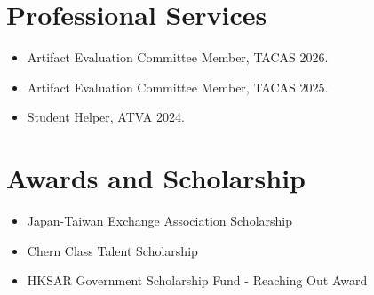 \documentclass[10pt,a4paper,roman]{moderncv}        %
\makeatletter
\newcommand*{\customcventry}[5][.25em]{
  \begin{tabular}{@{}l} 
    {\bfseries #2}
  \end{tabular}
  \hfill%
  \begin{tabular}{l@{}}
     {\bfseries #3}
  \end{tabular} 
  \ifx&#5&%
  \else{\\%
    \begin{minipage}{\maincolumnwidth}%
      \small#5%
    \end{minipage}}\fi%
  }
\makeatother
\begin{document}



\section{Professional Services}
\begin{itemize}
  \item Artifact Evaluation Committee Member, TACAS 2026.
  \item Artifact Evaluation Committee Member, TACAS 2025.
  \item Student Helper, ATVA 2024.
\end{itemize}


\section{Awards and Scholarship}
\begin{itemize}
  \item Japan-Taiwan Exchange Association Scholarship
  \item Chern Class Talent Scholarship
  \item HKSAR Government Scholarship Fund - Reaching Out Award
\end{itemize}
\end{document}

